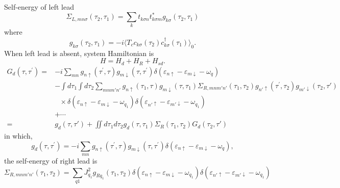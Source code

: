 \documentclass[11pt,a4paper]{article}
\begin{document}
Self-energy of left lead
\begin{equation}
\Sigma_{L,mn\sigma}(\tau_{2}, \tau_{1}) = \sum_{k} t_{k\sigma n}t_{k\sigma m}^{*} g_{k\sigma}(\tau_{2}, \tau_{1})
\end{equation}
where
\begin{equation}
g_{k\sigma}(\tau_{2}, \tau_{1}) = -i\langle T_{c}c_{k\sigma}(\tau_{2}) c_{k\sigma}^{\dag}(\tau_{1})\rangle_{0}.
\label{eq:left-self-energy}
\end{equation}
When left lead is absent, system Hamiltonian is
\begin{equation}
H = H_{d} + H_{R} + H_{sd}.
\end{equation}
\begin{equation}
\begin{split}
G_{d}\left(\tau, \tau^{\prime}\right) =&-i\sum_{mn} g_{n \uparrow}\left(\tau^{\prime}, \tau\right) g_{m \downarrow}\left(\tau, \tau^{\prime}\right) \delta(\varepsilon_{n\uparrow} - \varepsilon_{m\downarrow} - \omega_{q})\\
&-\int d\tau_{1}\int d\tau_{2} \sum_{mnm'n'}g_{n \uparrow}\left(\tau_{1}, \tau\right) g_{m \downarrow}\left(\tau, \tau_{1}\right) \Sigma_{R,mnm'n' }\left(\tau_{1}, \tau_{2}\right) g_{n'\uparrow}\left(\tau^{\prime}, \tau_{2}\right)g_{m'\downarrow}(\tau_{2}, \tau') \\
&~~~\times \delta(\varepsilon_{n\uparrow} - \varepsilon_{m\downarrow} - \omega_{q_{1}})\delta(\varepsilon_{n'\uparrow} - \varepsilon_{m'\downarrow} - \omega_{q_{1}})\\
& + \cdots \\
=& g_{d}(\tau, \tau') + \iint d\tau_{1}d\tau_{2}g_{d}(\tau, \tau_{1}) \Sigma_{R}(\tau_{1}, \tau_{2}) G_{d}(\tau_{2}, \tau')
\end{split}
\end{equation}
in which, 
\begin{equation}
g_{d}\left(\tau, \tau^{\prime}\right) = -i\sum_{mn} g_{n \uparrow}\left(\tau^{\prime}, \tau\right) g_{m \downarrow}\left(\tau, \tau^{\prime}\right) \delta(\varepsilon_{n\uparrow} - \varepsilon_{m\downarrow} - \omega_{q}),
\end{equation}
the self-energy of right lead is
\begin{equation}
\Sigma_{R,mnm'n'}(\tau_{1}, \tau_{2}) = \sum_{q1}J_{q_{1}}^{2} g_{Rq_{1}}(\tau_{1}, \tau_{2}) \delta(\varepsilon_{n\uparrow} - \varepsilon_{m\downarrow} - \omega_{q_{1}})\delta(\varepsilon_{n'\uparrow} - \varepsilon_{m'\downarrow} - \omega_{q_{1}})
\end{equation}
\end{document}
